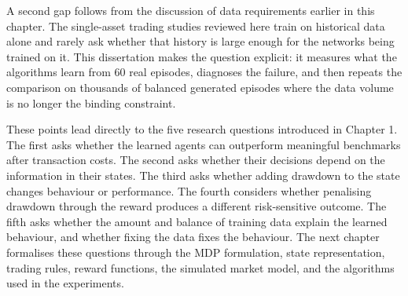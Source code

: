 A second gap follows from the discussion of data requirements earlier
in this chapter. The single-asset trading studies reviewed here train on
historical data alone and rarely ask whether that history is large
enough for the networks being trained on it. This dissertation makes the
question explicit: it measures what the algorithms learn from 60 real
episodes, diagnoses the failure, and then repeats the comparison on
thousands of balanced generated episodes where the data volume is no
longer the binding constraint.

These points lead directly to the five research questions introduced in
Chapter 1. The first asks whether the learned agents can outperform
meaningful benchmarks after transaction costs. The second asks whether
their decisions depend on the information in their states. The third
asks whether adding drawdown to the state changes behaviour or
performance. The fourth considers whether penalising drawdown through
the reward produces a different risk-sensitive outcome. The fifth asks
whether the amount and balance of training data explain the learned
behaviour, and whether fixing the data fixes the behaviour. The next
chapter formalises these questions through the MDP formulation, state
representation, trading rules, reward functions, the simulated market
model, and the algorithms used in the experiments.
